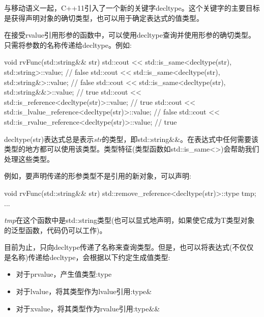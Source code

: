 与移动语义一起，C++11引入了一个新的关键字decltype。这个关键字的主要目标是获得声明对象的确切类型，也可以用于确定表达式的值类型。\par


在接受rvalue引用形参的函数中，可以使用decltype查询并使用形参的确切类型。只需将参数的名称传递给decltype。例如:\par

\begin{codebox}[cpp]
void rvFunc(std::string&& str)
{
  std::cout << std::is_same<decltype(str), std::string>::value; // false
  std::cout << std::is_same<decltype(str), std::string&>::value; // false
  std::cout << std::is_same<decltype(str), std::string&&>::value; // true
  std::cout << std::is_reference<decltype(str)>::value; // true
  std::cout << std::is_lvalue_reference<decltype(str)>::value; // false
  std::cout << std::is_rvalue_reference<decltype(str)>::value; // true
}
\end{codebox}

decltype(str)表达式总是表示\textit{str}的类型，即std::string\&\&。在表达式中任何需要该类型的地方都可以使用该类型。类型特征(类型函数如std::is\_same<>)会帮助我们处理这些类型。\par

例如，要声明传递的形参类型不是引用的新对象，可以声明:\par

\begin{codebox}[cpp]
void rvFunc(std::string&& str)
{
  std::remove_reference<decltype(str)>::type tmp;
  ...
}
\end{codebox}

\textit{tmp}在这个函数中是std::string类型(也可以显式地声明，如果使它成为T类型对象的泛型函数，代码仍可以工作)。\par


目前为止，只向decltype传递了名称来查询类型。但是，也可以将表达式(不仅仅是名称)传递给decltype，会根据以下约定生成值类型:\par

\begin{itemize}
  \item 对于prvalue，产生值类型:type
  \item 对于lvalue，将其类型作为lvalue引用:type\&
  \item 对于xvalue，将其类型作为rvalue引用:type\&\&
\end{itemize}

